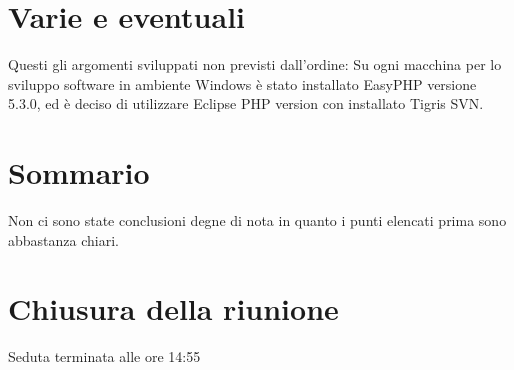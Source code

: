 \section*{Varie e eventuali}
Questi gli argomenti sviluppati non previsti dall'ordine:
Su ogni macchina per lo sviluppo software in ambiente Windows \`e stato
installato EasyPHP versione 5.3.0, ed \`e deciso di utilizzare Eclipse PHP
version con installato Tigris SVN.

\section*{Sommario}
Non ci sono state conclusioni degne di nota in quanto i punti elencati prima
sono abbastanza chiari.

\section*{Chiusura della riunione}
Seduta terminata alle ore 14:55